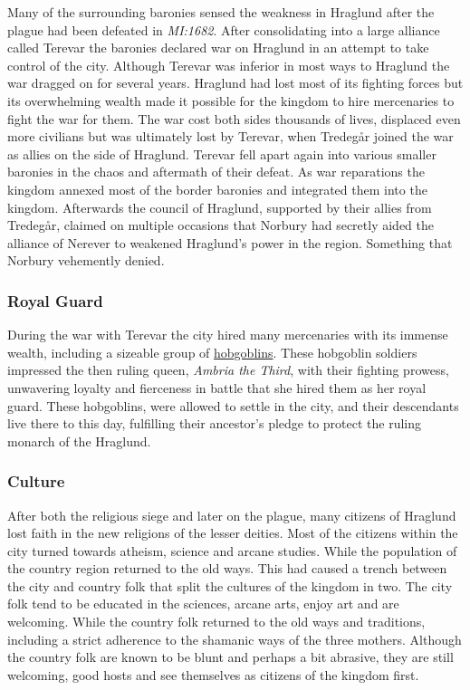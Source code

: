 Many of the surrounding baronies sensed the weakness in Hraglund after the
plague had been defeated in \emph{MI:1682}. After consolidating into a large
alliance called Terevar the baronies declared war on Hraglund in an attempt to
take control of the city. Although Terevar was inferior in most ways to
Hraglund the war dragged on for several years. Hraglund had lost most of its
fighting forces but its overwhelming wealth made it possible for the kingdom
to hire mercenaries to fight the war for them. The war cost both sides
thousands of lives, displaced even more civilians but was ultimately lost by
Terevar, when Tredegår joined the war as allies on the side of
Hraglund. Terevar fell apart again into various smaller baronies in the chaos
and aftermath of their defeat. As war reparations the kingdom annexed most of
the border baronies and integrated them into the kingdom. Afterwards the
council of Hraglund, supported by their allies from Tredegår, claimed on
multiple occasions that Norbury had secretly aided the alliance of Nerever to
weakened Hraglund's power in the region. Something that Norbury vehemently
denied.

\subsubsection{Royal Guard}
\label{sec:Royal Guard of Hraglund}

During the war with Terevar the city hired many mercenaries with its immense
wealth, including a sizeable group of \hyperref[sec:Hobgoblins]{hobgoblins}.
These hobgoblin soldiers impressed the then ruling queen, \emph{Ambria the
  Third}, with their fighting prowess, unwavering loyalty and fierceness in
battle that she hired them as her royal guard. These hobgoblins, were allowed
to settle in the city, and their descendants live there to this day,
fulfilling their ancestor's pledge to protect the ruling monarch of the
Hraglund.

\subsubsection{Culture}

After both the religious siege and later on the plague, many citizens of
Hraglund lost faith in the new religions of the lesser deities. Most of
the citizens within the city turned towards atheism, science and arcane
studies. While the population of the country region returned to the old
ways. This had caused a trench between the city and country folk that split
the cultures of the kingdom in two. The city folk tend to be educated in
the sciences, arcane arts, enjoy art and are welcoming. While the country folk
returned to the old ways and traditions, including a strict adherence to the
shamanic ways of the three mothers. Although the country folk are known to be
blunt and perhaps a bit abrasive, they are still welcoming, good hosts and see
themselves as citizens of the kingdom first.

